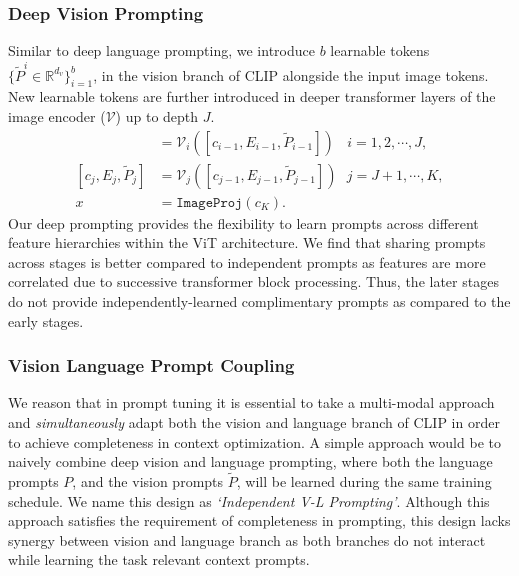 \documentclass[10pt,twocolumn,letterpaper]{article}
\begin{document}
\subsubsection{Deep Vision Prompting}
Similar to deep language prompting, we introduce $b$ learnable tokens $\{\tilde{P}^i \in \mathbb{R}^{d_v}\}_{i=1}^{b}$, in the vision branch of CLIP alongside the input image tokens. New learnable tokens are further introduced in deeper transformer layers of the image encoder ($\mathcal{V}$) up to depth $J$.
\begin{align*}
[c_i, E_i, \ \underline{\hspace{0.3cm}} \ ] &= \mathcal{V}_{i}([c_{i-1}, E_{i-1}, \tilde{P}_{i-1}])  \ ~~~ i=1, 2, \cdots, J, \\
[c_j, E_j, \tilde{P}_{j}] &= \mathcal{V}_{j}([c_{j-1}, E_{j-1}, \tilde{P}_{j-1}])  ~~~  j=J+1, \cdots, K,\\
x &= \texttt{ImageProj}({c}_K).
\end{align*}
Our deep prompting provides the flexibility to learn prompts across different feature hierarchies within the ViT architecture. We find that sharing prompts across stages is better compared to independent prompts as features are more correlated due to successive transformer block processing. Thus, the later stages do not provide independently-learned complimentary prompts as compared to the early stages.

\subsubsection{Vision Language Prompt Coupling} \label{section:compound_prompt_derivation}
We reason that in prompt tuning it is essential to take a multi-modal approach and \textit{simultaneously} adapt both the vision and language branch of CLIP in order to achieve completeness in context optimization. 
A simple approach would be to naively combine deep vision and language prompting, where both the language prompts $P$, and the vision prompts $\tilde{P}$, will be learned during the same training schedule. We name this design as \textit{`Independent V-L Prompting'}. Although this approach satisfies the requirement of completeness in prompting, this design lacks synergy between vision and language branch as both branches do not interact while learning the task relevant context prompts. 
\end{document}
